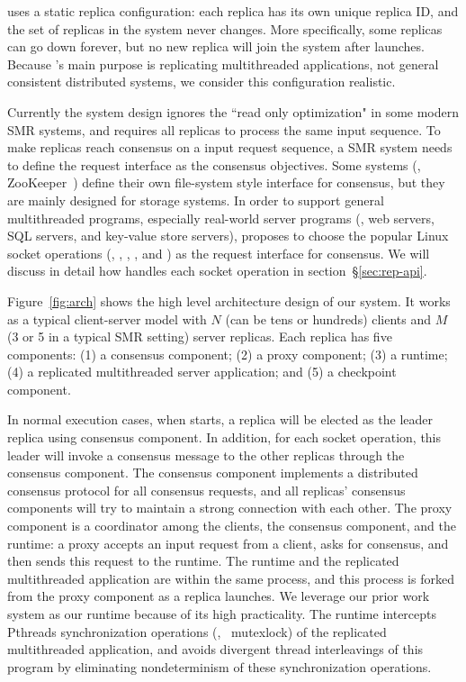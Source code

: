 \crane uses a static replica configuration: each replica has its own unique
replica ID, and the set of replicas in the \crane system never changes. More
specifically, some replicas can go down forever, but no new replica will join
the system after \crane launches. Because \crane's main purpose is replicating
multithreaded applications, not general consistent distributed systems, we
consider this configuration realistic.

Currently the \crane system design ignores the ``read only optimization" in some
modern SMR systems, and requires all replicas to process the same input
sequence. To make replicas reach consensus on a input request sequence, a SMR
system needs to define the request interface as the consensus objectives. Some
systems (\eg, ZooKeeper~\cite{zookeeper}) define their own file-system style
interface for consensus, but they are mainly designed for storage systems. In
order to support general multithreaded programs, especially real-world server
programs (\eg, web servers, SQL servers, and key-value store servers), \crane
proposes to choose the popular Linux socket operations (\eg, \connect, \accept,
\send, and \recv) as the request interface for consensus. We will discuss in
detail how \crane handles each socket operation in section~\S\ref{sec:rep-api}.

Figure~\ref{fig:arch} shows the high level architecture design of our \crane
system. It works as a typical client-server model with $N$ (can be tens or
hundreds) clients and $M$ (3 or 5 in a typical SMR setting) server replicas.
Each \crane replica has five components: (1) a consensus component; (2) a proxy
component; (3) a \smt runtime; (4) a replicated multithreaded server
application; and (5) a checkpoint component.

In normal execution cases, when \crane starts, a replica will be elected as the
leader replica using consensus component. In addition, for each socket
operation, this leader will invoke a consensus message to the other replicas
through the consensus component. The consensus component implements a \paxos
distributed consensus protocol for all consensus requests, and all replicas'
consensus components will try to maintain a strong connection with each other.
The proxy component is a coordinator among the clients, the consensus component,
and the \smt runtime: a proxy accepts an input request from a client, asks for
consensus, and then sends this request to the \smt runtime. The \smt runtime and
the replicated multithreaded application are within the same process, and this
process is forked from the proxy component as a replica launches. We leverage
our prior work \parrot system as our \smt runtime because of its high
practicality. The \parrot runtime intercepts Pthreads synchronization operations
(\eg, \
mutexlock) of the replicated multithreaded application, and avoids divergent
thread interleavings of this program by eliminating nondeterminism of these
synchronization operations.

